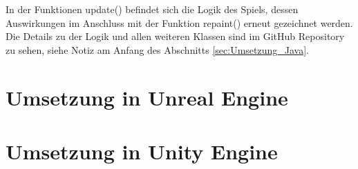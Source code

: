 \documentclass[
	12pt, %
	a4paper,
	listof=totoc, %
	bibliography=totoc, %
	numbers=noenddot, %
	ngerman, %
	headsepline, %
	oneside %
	]{scrbook} %
\begin{document}
In der Funktionen update() befindet sich die Logik des Spiels, dessen Auswirkungen im Anschluss mit der Funktion repaint() erneut gezeichnet werden.  
Die Details zu der Logik und allen weiteren Klassen sind im GitHub Repository zu sehen, siehe Notiz am Anfang des Abschnitts \ref{sec:Umsetzung_Java}.


\section{Umsetzung in Unreal Engine}

\section{Umsetzung in Unity Engine}

%
%
%
\end{document}
